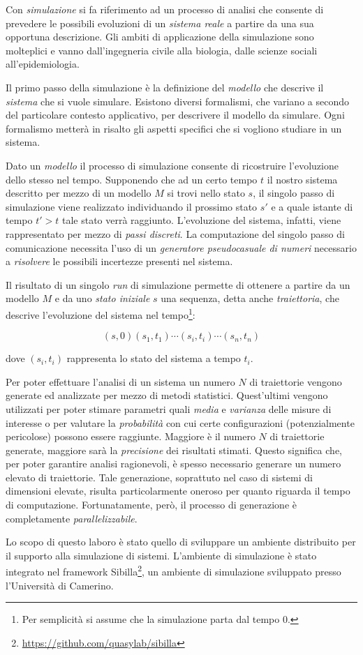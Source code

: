 
Con \emph{simulazione} si fa riferimento ad un processo di analisi che consente di prevedere le possibili evoluzioni di un \emph{sistema reale} a partire da una sua opportuna descrizione. 
%
Gli ambiti di applicazione della simulazione sono molteplici e vanno dall'ingegneria civile alla biologia, dalle scienze sociali all'epidemiologia.

Il primo passo della simulazione \`e la definizione del \emph{modello} che descrive il \emph{sistema} che si vuole simulare.
%
Esistono diversi formalismi, che variano a secondo del particolare contesto applicativo, per descrivere il modello da simulare.
%
Ogni formalismo metter\`a in risalto gli aspetti specifici che si vogliono studiare in un sistema. 

Dato un \emph{modello} il processo di simulazione consente di ricostruire l'evoluzione dello stesso nel tempo. 
%
Supponendo che ad un certo tempo $t$ il nostro sistema descritto per mezzo di un modello $M$ si trovi nello stato $s$, il singolo passo di simulazione viene realizzato individuando il prossimo stato $s'$ e a quale  istante di tempo $t'>t$ tale stato verr\`a raggiunto. 
%
L'evoluzione del sistema, infatti, viene rappresentato per mezzo di \emph{passi discreti}.
%
La computazione del singolo passo di comunicazione necessita l'uso di un \emph{generatore pseudocasuale di numeri} necessario a \emph{risolvere} le possibili incertezze presenti nel sistema.

Il risultato di un singolo \emph{run} di simulazione permette di ottenere a partire da un modello $M$ e da uno \emph{stato iniziale} $s$ una sequenza, detta anche \emph{traiettoria}, che descrive l'evoluzione del sistema nel tempo\footnote{Per semplicit\`a si assume che la simulazione parta dal tempo $0$.}:

\[
(s,0)(s_1,t_1)\cdots (s_i,t_i)\cdots (s_n,t_n)
\]  

\noindent
dove $(s_i,t_i)$ rappresenta lo stato del sistema a tempo $t_i$.

Per poter effettuare l'analisi di un sistema un numero $N$ di traiettorie vengono generate ed analizzate per mezzo di metodi statistici. Quest'ultimi vengono utilizzati per poter stimare parametri quali \emph{media} e \emph{varianza} delle misure di interesse o per valutare la \emph{probabilit\`a} con cui certe configurazioni (potenzialmente pericolose) possono essere raggiunte.
%
Maggiore \`e il numero $N$ di traiettorie generate, maggiore sar\`a la \emph{precisione} dei risultati stimati. 
%
Questo significa che, per poter garantire analisi ragionevoli, \`e spesso necessario generare un numero elevato di traiettorie.
%
Tale generazione, soprattuto nel caso di sistemi di dimensioni elevate, risulta particolarmente oneroso per quanto riguarda il tempo di computazione.
%
Fortunatamente, per\`o, il processo di generazione \`e completamente \emph{parallelizzabile}.

Lo scopo di questo laboro \`e stato quello di sviluppare un ambiente distribuito per il supporto alla simulazione di sistemi. L'ambiente di simulazione \`e stato integrato nel framework Sibilla\footnote{\url{https://github.com/quasylab/sibilla}}, un ambiente di simulazione sviluppato presso l'Universit\`a di Camerino.
